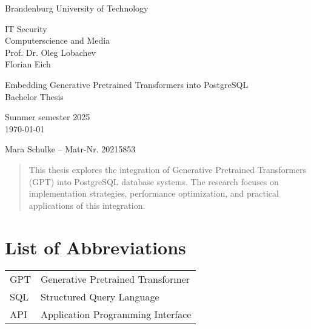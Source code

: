 \documentclass{article}
\begin{document}
\begin{titlepage}
    \begin{center}
        \begin{Large}
            Brandenburg University of Technology \\[1em]
        \end{Large}
        IT Security \\
        Computerscience and Media \\
        Prof. Dr. Oleg Lobachev \\
        Florian Eich
    \end{center}

    \vfill

    \begin{center}
        \Large{Embedding Generative Pretrained Transformers into PostgreSQL}\\[0.5em]
        \large{Bachelor Thesis}\\[1em]
        
        \begin{normalsize}
            Summer semester 2025\\[0.25em]
            \today
        \end{normalsize}
    \end{center}

    \vfill

    \begin{center}
        Mara Schulke – Matr-Nr. 20215853
    \end{center}
\end{titlepage}

\begin{abstract}
This thesis explores the integration of Generative Pretrained Transformers (GPT)
into PostgreSQL database systems. The research focuses on implementation strategies,
performance optimization, and practical applications of this integration.
\end{abstract}

\tableofcontents

\listoffigures

\section*{List of Abbreviations}
\begin{tabular}{ll}
GPT & Generative Pretrained Transformer \\
SQL & Structured Query Language \\
API & Application Programming Interface \\
\end{tabular}
\end{document}
